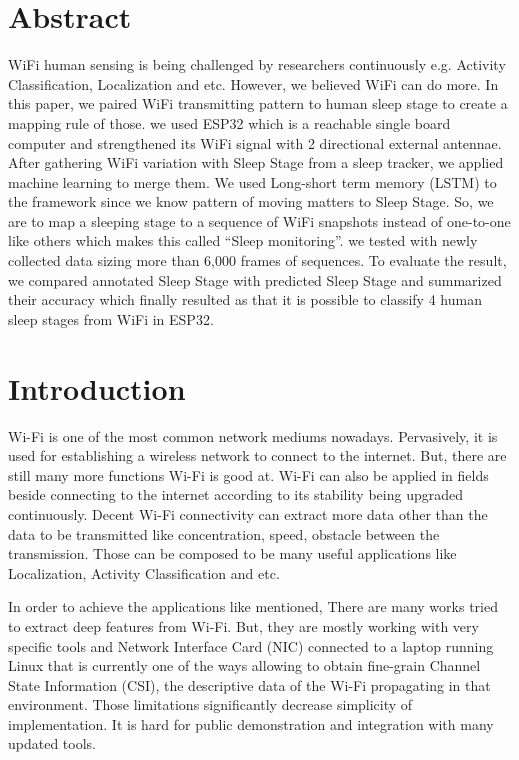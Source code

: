 \documentclass[10pt,letterpaper]{article}
\begin{document}
	\section*{Abstract}
	

	WiFi human sensing is being challenged by researchers continuously e.g. Activity Classification, Localization and etc. However, we believed WiFi can do more. In this paper, we paired WiFi transmitting pattern to human sleep stage to create a mapping rule of those. we used ESP32 which is a reachable single board computer and strengthened its WiFi signal with 2 directional external antennae. After gathering WiFi variation with Sleep Stage from a sleep tracker, we applied machine learning to merge them. We used Long-short term memory (LSTM) to the framework since we know pattern of moving matters to Sleep Stage. So, we are to map a sleeping stage to a sequence of WiFi snapshots instead of one-to-one like others which makes this called ``Sleep monitoring''. we tested with newly collected data sizing more than 6,000 frames of sequences. To evaluate the result, we compared annotated Sleep Stage with predicted Sleep Stage and summarized their accuracy which finally resulted as that it is possible to classify 4 human sleep stages from WiFi in ESP32.
	
	
	
	\linenumbers
	
	\section*{Introduction}
	Wi-Fi is one of the most common network mediums nowadays. Pervasively, it is used for establishing a wireless network to connect to the internet. But, there are still many more functions Wi-Fi is good at. Wi-Fi can also be applied in fields beside connecting to the internet according to its stability being upgraded continuously. Decent Wi-Fi connectivity can extract more data other than the data to be transmitted like concentration, speed, obstacle between the transmission. Those can be composed to be many useful applications like Localization, Activity Classification and etc.
	
	In order to achieve the applications like mentioned, There are many works tried to extract deep features from Wi-Fi. But, they are mostly working with very specific tools and Network Interface Card (NIC) connected to a laptop running Linux that is currently one of the ways allowing to obtain fine-grain Channel State Information (CSI), the descriptive data of the  Wi-Fi propagating in that environment. Those limitations significantly decrease simplicity of implementation. It is hard for public demonstration and integration with many updated tools.
	
\end{document}
